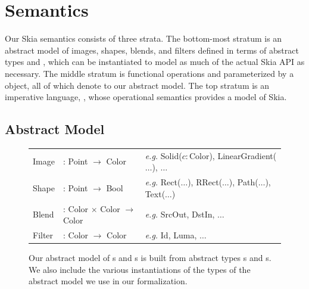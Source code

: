 \section{Semantics}
\label{sec:semantics}

Our Skia semantics consists of three strata.
The bottom-most stratum is an abstract model of
  images, shapes, blends, and filters defined in terms
  of abstract types \Point and \Color,
  which can be instantiated to model
  as much of the actual Skia API as necessary.
The middle stratum is functional operations
  \DrawShape and \BlendLayer
  parameterized by a \Paint object,
  all of which denote to our abstract model.
The top stratum is an imperative language, \muskia,
  whose operational semantics provides a model of Skia.

\subsection{Abstract Model}
\label{subsec:abstractmodel}

\begin{figure}
  \centering
  \begin{tabular}{L L L}
    Image  & : \; Point $\to$ Color & \textrm{\textit{e.g.}}\; {\sffamily
                                      Solid($c : \text{Color}$), LinearGradient($\ldots$),
                                      $\ldots$} \\[4pt]
    Shape  & : \; Point $\to$ Bool & \textrm{\textit{e.g.}}\; {\sffamily
                                     Rect($\ldots$), RRect($\ldots$),
                                     Path($\ldots$), Text($\ldots$)} \\[4pt]
    Blend  & : \; Color $\times$ Color $\to$ Color & \textrm{\textit{e.g.}}\;
                                                     {\sffamily SrcOut, DstIn,
                                                     $\ldots$} \\[4pt]
    Filter & : \; Color $\to$ Color & \textrm{\textit{e.g.}}\; {\sffamily Id,
                                      Luma, $\ldots$}
  \end{tabular}
  \caption{%
    Our abstract model of \Image{}s
      and \Shape{}s is built from
      abstract types \Point{}s and \Color{}s.
    We also include the various instantiations of the types of the abstract model we use in
      our formalization.
  }
\label{fig:model}
\end{figure}


